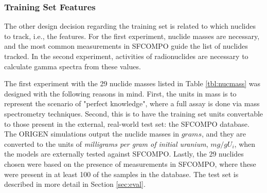\subsubsection{Training Set Features}
\label{sec:snffeats}

 The other design decision regarding the training set is related to
which nuclides to track, i.e., the features.  For the first experiment, nuclide
masses are necessary, and the most common measurements in \gls{SFCOMPO} guide
the list of nuclides tracked.  In the second experiment, activities of
radionuclides are necessary to calculate gamma spectra from these values.

The first experiment with the 29 nuclide masses listed in Table
\ref{tbl:nucmass} was designed with the following reasons in mind.  First, the
units in mass is to represent the scenario of "perfect knowledge", where a full
assay is done via mass spectrometry techniques.  Second, this is to have the
training set units convertable to those present in the external, real-world
test set: the \gls{SFCOMPO} database.  The \gls{ORIGEN} simulations output the
nuclide masses in $grams$, and they are converted to the units of
\textit{milligrams per gram of initial uranium}, $mg/gU_i$, when the models are
externally tested against \gls{SFCOMPO}. Lastly, the 29 nuclides chosen were
based on the presence of measurements in \gls{SFCOMPO}, where these were
present in at least 100 of the samples in the database.  The test set is
described in more detail in Section \ref{sec:eval}.

